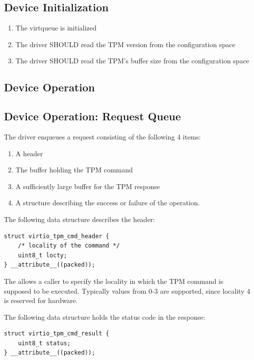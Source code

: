 \subsection{Device Initialization}\label{sec:Device Types / TPM Device / Device Initialization}

\begin{enumerate}
\item The virtqueue is initialized
\item The driver SHOULD read the TPM version from the configuration space
\item The driver SHOULD read the TPM's buffer size from the configuration
space
\end{enumerate}

\subsection{Device Operation}\label{sec:Device Types / TPM Device / Device Operation}

\subsection{Device Operation: Request Queue}\label{sec:Device Types / TPM Device / Device Operation: Request Queue}

The driver enqueues a request consisting of the following 4 items:

\begin{enumerate}
\item A header
\item The buffer holding the TPM command
\item A sufficiently large buffer for the TPM response
\item A structure describing the success or failure of the operation.
\end{enumerate}

The following data structure describes the header:
\begin{lstlisting}
struct virtio_tpm_cmd_header {
	/* locality of the command */
	uint8_t locty;
} __attribute__((packed));
\end{lstlisting}

The  allows a caller to specify the locality in which the TPM
command is supposed to be executed. Typically values from 0-3 are supported,
since locality 4 is reserved for hardware.

The following data structure holds the status code in the response:
\begin{lstlisting}
struct virtio_tpm_cmd_result {
	uint8_t status;
} __attribute__((packed));
\end{lstlisting}

